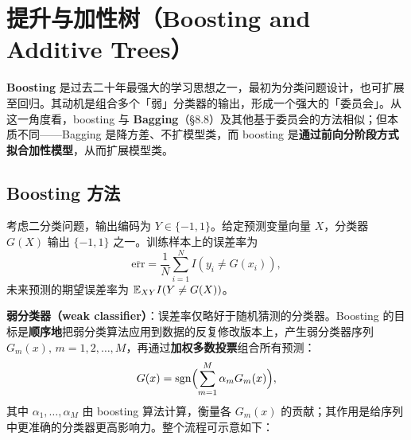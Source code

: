 \chapter{提升与加性树（Boosting and Additive Trees）}

\textbf{Boosting} 是过去二十年最强大的学习思想之一，最初为分类问题设计，也可扩展至回归。其动机是组合多个「弱」分类器的输出，形成一个强大的「委员会」。从这一角度看，boosting 与 \textbf{Bagging}（§8.8）及其他基于委员会的方法相似；但本质不同——Bagging 是降方差、不扩模型类，而 boosting 是\textbf{通过前向分阶段方式拟合加性模型}，从而扩展模型类。

\section{Boosting 方法}

考虑二分类问题，输出编码为 $Y \in \{-1, 1\}$。给定预测变量向量 $X$，分类器 $G(X)$ 输出 $\{-1, 1\}$ 之一。训练样本上的误差率为
\begin{equation}\label{eq:10_err}
    \overline{\mathrm{err}} = \frac{1}{N}\sum_{i=1}^{N} I(y_i \neq G(x_i)),
\end{equation}
未来预测的期望误差率为 $\mathbb{E}_{XY} I(Y \neq G(X))$。

\textbf{弱分类器（weak classifier）}：误差率仅略好于随机猜测的分类器。Boosting 的目标是\textbf{顺序地}把弱分类算法应用到数据的反复修改版本上，产生弱分类器序列 $G_m(x),\, m = 1, 2, \ldots, M$，再通过\textbf{加权多数投票}组合所有预测：
\begin{equation}\label{eq:10_1}
    G(x) = \mathrm{sgn}\Bigl(\sum_{m=1}^{M} \alpha_m G_m(x)\Bigr),
\end{equation}
其中 $\alpha_1, \ldots, \alpha_M$ 由 boosting 算法计算，衡量各 $G_m(x)$ 的贡献；其作用是给序列中更准确的分类器更高影响力。整个流程可示意如下：

